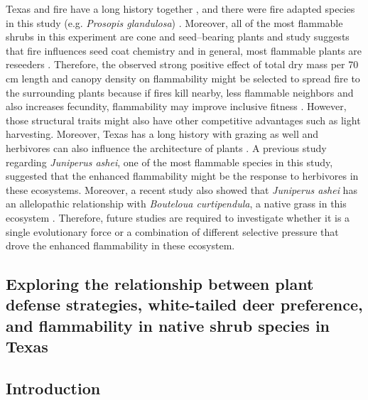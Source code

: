 \documentclass{ttuthes2007}
\begin{document}
Texas and fire have a long history together \citep{moir1982firehistory, stambaugh2011firehistory,stambaugh2014historicalfirehistory,smeins2005historyoffire1}, and there were fire adapted species in this study (e.g. \emph{Prosopis glandulosa}) \citep{wright1976effect}. %
Moreover, all of the most flammable shrubs in this experiment are cone and seed--bearing plants %
and study suggests that fire influences seed coat chemistry \citep{mcinnes2022doesseedcoatchemistry} and in general, most flammable plants are reseeders \citep{midgley2011pushingreseeders}. Therefore,  the observed strong positive effect of total dry mass per 70\,cm length and canopy density on flammability might be selected to spread fire to the surrounding plants because if fires kill nearby, less flammable neighbors and also increases fecundity, flammability may improve inclusive fitness \citep{bond1995kill}. However, those structural traits might also have other competitive advantages such as light harvesting. Moreover, Texas has a long history with grazing as well and herbivores can also influence the architecture of plants \citep{danell1994browseeffects}. A previous study regarding \emph{Juniperus ashei}, one of the most flammable species in this study, suggested that the enhanced flammability might be the response to herbivores \citep{owens1998seasonal} in these ecosystems. Moreover, a recent study also showed that \emph{Juniperus ashei} has an allelopathic relationship with \emph{Bouteloua curtipendula}, a native grass in this ecosystem \citep{young2009assessmentallelopathy}. Therefore, future studies are required to investigate whether it is a single evolutionary force or a combination of different selective pressure that drove the enhanced flammability in these ecosystem.

\begin{singlespace}
    \chapter{\textbf{Exploring the relationship between plant defense strategies, white-tailed deer preference, and flammability in native shrub species in Texas}} 
\end{singlespace}




\section{Introduction}
\end{document}
